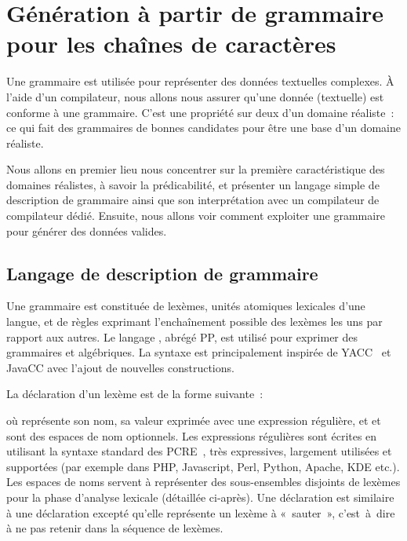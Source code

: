 \section{Génération à partir de grammaire pour les chaînes de caractères}
\label{section:data:strings}

Une grammaire est utilisée pour représenter des données textuelles complexes.  À
l'aide d'un compilateur, nous allons nous assurer qu'une donnée (textuelle) est
conforme à une grammaire. C'est une propriété sur deux d'un domaine réaliste~:
ce qui fait des grammaires de bonnes candidates pour être une base d'un domaine
réaliste.

Nous allons en premier lieu nous concentrer sur la première caractéristique des
domaines réalistes, à savoir la prédicabilité, et présenter un langage simple de
description de grammaire ainsi que son interprétation avec un compilateur de
compilateur dédié. Ensuite, nous allons voir comment exploiter une grammaire
pour générer des données valides.

\subsection{Langage de description de grammaire}
\label{subsection:data:pp}

Une grammaire est constituée de {\strong lexèmes}, unités atomiques lexicales
d'une langue, et de {\strong règles} exprimant l'enchaînement possible des
lexèmes les uns par rapport aux autres. Le langage ,
abrégé PP, est utilisé pour exprimer des grammaires  et
algébriques. La syntaxe est principalement inspirée de YACC~ et
JavaCC avec l'ajout de nouvelles constructions.

La déclaration d'un lexème est de la forme suivante~:

\begin{pre}
\end{pre}
%
où  représente son nom,  sa valeur exprimée avec une
expression régulière, et  et  sont des espaces
de nom optionnels. Les expressions régulières sont écrites en utilisant la
syntaxe standard des PCRE~, très expressives, largement utilisées
et supportées (par exemple dans PHP, Javascript, Perl, Python, Apache, KDE
etc.). Les espaces de noms servent à représenter des sous-ensembles disjoints de
lexèmes pour la phase d'analyse lexicale (détaillée ci-après). Une déclaration
 est similaire à une déclaration  excepté qu'elle
représente un lexème à «~sauter~», c'est~à~dire à ne pas retenir dans la
séquence de lexèmes.

